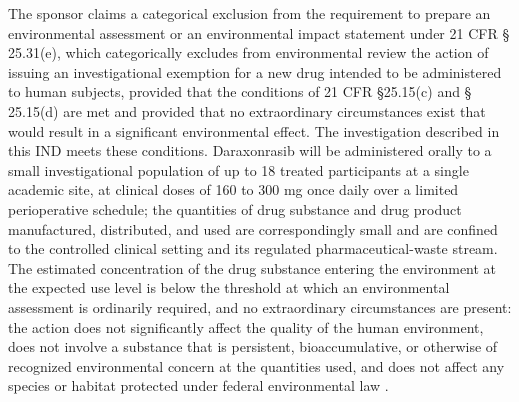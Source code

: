 The sponsor claims a categorical exclusion from the requirement to prepare an
environmental assessment or an environmental impact statement under 21 CFR \S
25.31(e), which categorically excludes from environmental review the action of
issuing an investigational exemption for a new drug intended to be administered to
human subjects, provided that the conditions of 21 CFR \S 25.15(c) and \S
25.15(d) are met and provided that no extraordinary circumstances exist that would
result in a significant environmental effect. The investigation described in this
IND meets these conditions. Daraxonrasib will be administered orally to a small
investigational population of up to 18 treated participants at a single academic
site, at clinical doses of 160 to 300 mg once daily over a limited perioperative
schedule; the quantities of drug substance and drug product manufactured,
distributed, and used are correspondingly small and are confined to the
controlled clinical setting and its regulated pharmaceutical-waste stream. The
estimated concentration of the drug substance entering the environment at the
expected use level is below the threshold at which an environmental assessment is
ordinarily required, and no extraordinary circumstances are present: the action
does not significantly affect the quality of the human environment, does not
involve a substance that is persistent, bioaccumulative, or otherwise of
recognized environmental concern at the quantities used, and does not affect any
species or habitat protected under federal environmental law
\cite{phase1guidance}.

